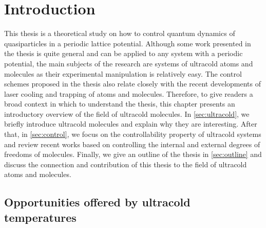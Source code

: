 
\chapter{Introduction}
\label{ch:Introduction}

This thesis is a theoretical study on how to control quantum dynamics of quasiparticles in a periodic lattice potential. 
Although some work presented in the thesis is quite general and can be applied to any system with a periodic potential, 
the main subjects of the research are systems of ultracold atoms and molecules as their experimental manipulation is 
relatively easy. The control schemes proposed in the thesis also relate closely with the recent developments of laser 
cooling and trapping of atoms and molecules. Therefore, to give readers a broad context in which to understand the 
thesis, this chapter presents an introductory overview of the field of ultracold molecules. In \autoref{sec:ultracold}, we briefly introduce ultracold  molecules and explain why they are interesting. After
that, in \autoref{sec:control}, we focus on the controllability property of ultracold systems and review recent works 
based on controlling the internal and external degrees of freedoms of  molecules. 
Finally, we give an outline of the thesis in \autoref{sec:outline} and discuss the connection and contribution of  
this thesis to the field of ultracold atoms and molecules. 

\section{Opportunities offered by ultracold temperatures}
\label{sec:ultracold}

